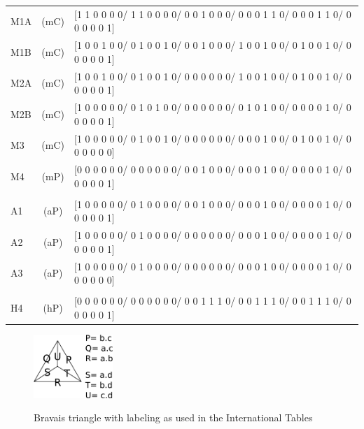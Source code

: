 \documentclass[preprint]{iucr}              %
\begin{document}
{\begin{table}
\begin{tabular}{lcl}
M1A & (mC) & [1 1 0 0 0 0/  1 1 0 0 0 0/  0 0 1 0 0 0/  0 0 0 1 1 0/  0 0 0 1 1 0/  0 0 0 0 0 1] \\ 
M1B & (mC) & [1 0 0 1 0 0/  0 1 0 0 1 0/  0 0 1 0 0 0/  1 0 0 1 0 0/  0 1 0 0 1 0/  0 0 0 0 0 1] \\ 
M2A & (mC) & [1 0 0 1 0 0/  0 1 0 0 1 0/  0 0 0 0 0 0/  1 0 0 1 0 0/  0 1 0 0 1 0/  0 0 0 0 0 1] \\ 
M2B & (mC) & [1 0 0 0 0 0/  0 1 0 1 0 0/  0 0 0 0 0 0/  0 1 0 1 0 0/  0 0 0 0 1 0/  0 0 0 0 0 1] \\ 
M3  & (mC) & [1 0 0 0 0 0/  0 1 0 0 1 0/  0 0 0 0 0 0/  0 0 0 1 0 0/  0 1 0 0 1 0/  0 0 0 0 0 0] \\ 
M4  & (mP) & [0 0 0 0 0 0/  0 0 0 0 0 0/  0 0 1 0 0 0/  0 0 0 1 0 0/  0 0 0 0 1 0/  0 0 0 0 0 1] \\ \\

A1  & (aP) & [1 0 0 0 0 0/  0 1 0 0 0 0/  0 0 1 0 0 0/  0 0 0 1 0 0/  0 0 0 0 1 0/  0 0 0 0 0 1] \\ 
A2  & (aP) & [1 0 0 0 0 0/  0 1 0 0 0 0/  0 0 0 0 0 0/  0 0 0 1 0 0/  0 0 0 0 1 0/  0 0 0 0 0 1] \\ 
A3  & (aP) & [1 0 0 0 0 0/  0 1 0 0 0 0/  0 0 0 0 0 0/  0 0 0 1 0 0/  0 0 0 0 1 0/  0 0 0 0 0 0] \\ \\

H4  & (hP) & [0 0 0 0 0 0/  0 0 0 0 0 0/  0 0 1 1 1 0/  0 0 1 1 1 0/  0 0 1 1 1 0/  0 0 0 0 0 1] \\ 
\bottomrule
	\end{tabular}
\end{table}
}


\begin{figure}
\caption{Bravais triangle with labeling as used in the International Tables}
\includegraphics[width=3cm]{PQRSTU}
\label{fig:PQRSTU}
\end{figure}
\end{document}
